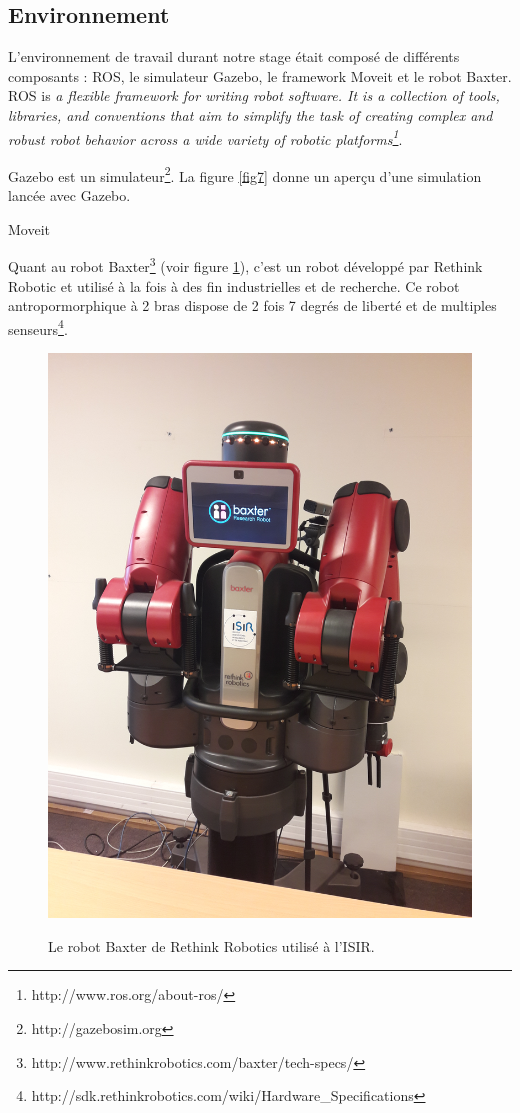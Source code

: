 \documentclass{llncs}
\begin{document}




\subsection{Environnement}

L'environnement de travail durant notre stage était composé de différents composants : ROS,  le simulateur  Gazebo, le framework Moveit et le robot Baxter. ROS is \textit{a flexible framework for writing robot software. It is a collection of tools, libraries, and conventions that aim to simplify the task of creating complex and robust robot behavior across a wide variety of robotic platforms\footnote{http://www.ros.org/about-ros/}}.

Gazebo est un simulateur\footnote{http://gazebosim.org}. La figure \ref{fig7} donne un aperçu d'une simulation lancée avec Gazebo.

Moveit

Quant au robot Baxter\footnote{http://www.rethinkrobotics.com/baxter/tech-specs/} (voir figure \ref{fig:baxter}), c'est un robot développé par Rethink Robotic et utilisé à la fois à des fin industrielles et de recherche. Ce robot antropormorphique à 2 bras dispose de 2 fois 7 degrés de liberté et de multiples senseurs\footnote{http://sdk.rethinkrobotics.com/wiki/Hardware\_Specifications}.

\begin{figure}
	\centering
	\includegraphics[angle=-90,width=.4\textwidth]{figures/baxter}
	\label{fig:baxter}
	\caption{Le robot Baxter de Rethink Robotics utilisé à l'ISIR.}
\end{figure}

\end{document}
